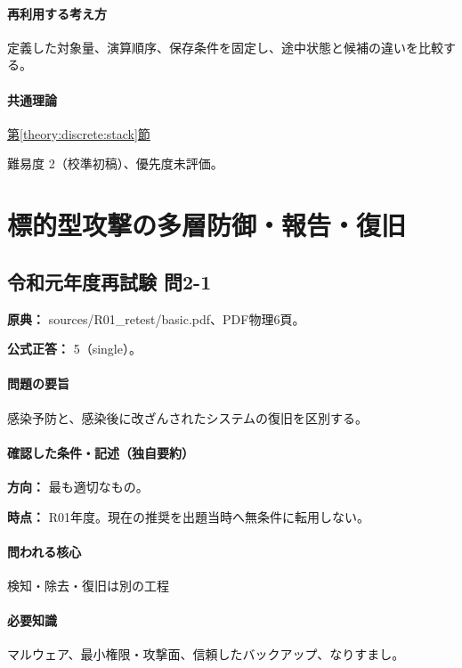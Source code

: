 \paragraph{再利用する考え方} 定義した対象量、演算順序、保存条件を固定し、途中状態と候補の違いを比較する。

\paragraph{共通理論} \hyperref[theory:discrete:stack]{第\ref*{theory:discrete:stack}節}

\par 難易度 2（校準初稿）、優先度未評価。

\section{標的型攻撃の多層防御・報告・復旧}

\subsection{令和元年度再試験 問2-1}
\label{q:r01-ret-basic-2-1}

\noindent\textbf{原典：} sources/R01\_retest/basic.pdf、PDF物理6頁。

\textbf{公式正答：} 5（single）。

\paragraph{問題の要旨} 感染予防と、感染後に改ざんされたシステムの復旧を区別する。

\paragraph{確認した条件・記述（独自要約）}\mbox{}\par

\noindent\textbf{方向：} 最も適切なもの。\par

\noindent\textbf{時点：} R01年度。現在の推奨を出題当時へ無条件に転用しない。\par

\paragraph{問われる核心} 検知・除去・復旧は別の工程

\paragraph{必要知識} マルウェア、最小権限・攻撃面、信頼したバックアップ、なりすまし。

